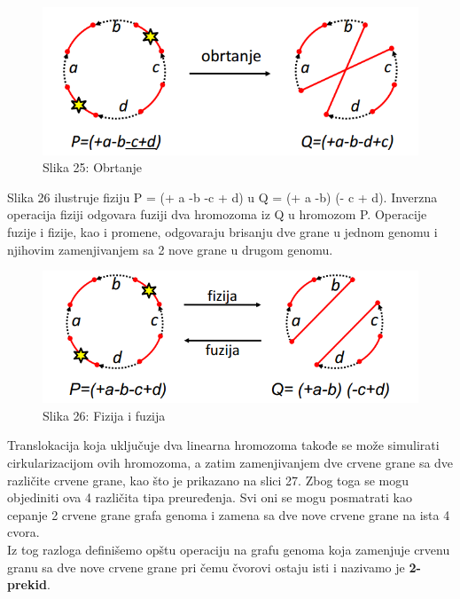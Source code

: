 \documentclass{article}
\begin{document}
\begin{figure}[h!]
\centering
\includegraphics[scale=0.6]{slike/obrtanje.PNG}
\caption{Slika 25: Obrtanje}
\label{slika:X}
\end{figure}

Slika 26 ilustruje fiziju P = (+ a -b -c + d) u Q = (+ a -b) (- c + d).
Inverzna operacija fiziji odgovara fuziji dva hromozoma iz Q u hromozom P. Operacije fuzije i fizije, kao i promene, odgovaraju brisanju dve grane u jednom genomu i njihovim zamenjivanjem sa 2 nove grane u drugom genomu.\\

\begin{figure}[h!]
\centering
\includegraphics[scale=0.6]{slike/fizija_fusija.PNG}
\caption{Slika 26: Fizija i fuzija}
\label{slika:X}
\end{figure}

\newpage
Translokacija koja uključuje dva linearna hromozoma takođe se može simulirati cirkularizacijom ovih hromozoma, a zatim zamenjivanjem dve crvene grane sa dve različite crvene grane, kao što je prikazano na slici 27. Zbog toga se mogu objediniti ova 4 različita tipa preuređenja. Svi oni se mogu posmatrati kao cepanje 2 crvene grane grafa genoma i zamena sa dve nove crvene grane na ista 4 cvora. \\
Iz tog razloga definišemo opštu operaciju na grafu genoma
koja zamenjuje crvenu granu sa dve nove crvene grane pri čemu čvorovi ostaju isti i nazivamo je \textbf{2-prekid}.\\
\end{document}
